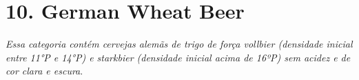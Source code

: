 \section*{10. German Wheat Beer}
\textit{Essa categoria contém cervejas alemãs de trigo de força vollbier (densidade inicial entre 11°P e 14°P) e starkbier (densidade inicial acima de 16ºP) sem acidez e de cor clara e escura}.

